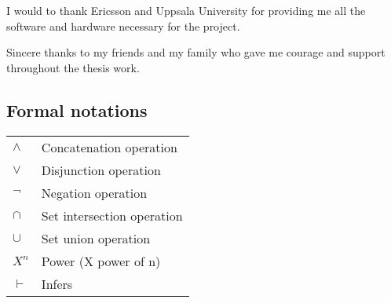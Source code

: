 \documentclass[titlepage]{book}
\begin{document}
I would to thank Ericsson and Uppsala University for providing me all the software and hardware necessary for the project.

Sincere thanks to my friends and my family who gave me courage and support throughout the thesis work.





\tableofcontents
\listoffigures
\listoftables

\newpage
\begin{center}
\section{Formal notations}
\begin{table}[h]
\centering
    \begin{tabular}{l  l}
        $\wedge$ & Concatenation operation \\
        $\vee$ & Disjunction operation \\
        $\neg$ & Negation operation \\
        $\cap$ & Set intersection operation \\
        $\cup$ & Set union operation \\
        $X^n$ & Power (X power of n) \\
        $\vdash$ & Infers

    \end{tabular}
\end{table}
\end{center}


\mainmatter

\setcounter{secnumdepth}{1}







\printindex

{}




\end{document}
